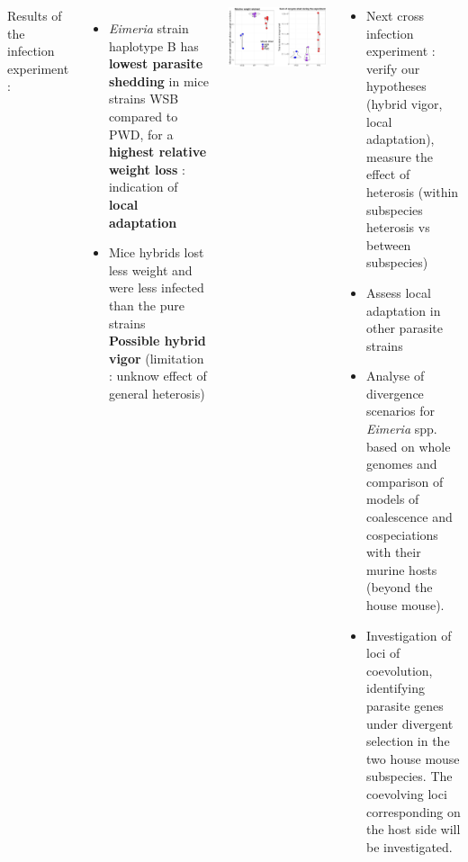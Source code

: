\documentclass[30pt, a0paper, portrait, margin=0mm, innermargin=15mm,
               blockverticalspace=15mm, colspace=15mm, subcolspace=8mm]{tikzposter}
\begin{document}
\begin{columns}

{ Results of the infection experiment : 
  \begin{itemize}
    \item \textit{Eimeria} strain haplotype B has \textbf{lowest parasite shedding} in mice strains WSB compared to PWD, for a \textbf{highest relative weight loss} : indication of \textbf{local adaptation}
    \item Mice hybrids lost less weight and  were less infected than the pure strains\\ \textbf{Possible hybrid vigor} (limitation : unknow effect of general heterosis)\\
  \end{itemize}

  \begin{center}
  \includegraphics[scale=1.1]{May2017_E64.pdf}

  \end{center}
}

{
  \begin{center}
  \begin{itemize}
        \item Next cross infection experiment : verify our hypotheses (hybrid vigor, local adaptation), measure the effect of heterosis (within subspecies heterosis vs between subspecies)
        \item Assess local adaptation in other parasite strains
        \item Analyse of divergence scenarios for \textit{Eimeria} spp. based on whole genomes and comparison of models of coalescence and cospeciations with their murine hosts (beyond the house mouse).
        \item Investigation of loci of coevolution, identifying parasite genes under divergent selection in the two house mouse subspecies. The coevolving loci corresponding on the host side will be investigated.
  \end{itemize}


\end{center}}
\end{columns}
\end{document}
